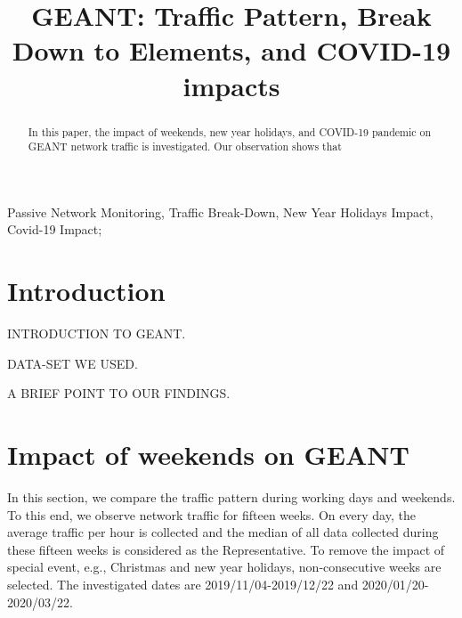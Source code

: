 \documentclass[10pt, journal, letterpaper]{IEEEtran}
\begin{document}
\title{GEANT: Traffic Pattern, Break Down to Elements, and COVID-19 impacts}
\author{}
\maketitle	
\begin{abstract}
In this paper, the impact of weekends, new year holidays, and COVID-19 pandemic on GEANT network traffic is investigated. Our observation shows that 
\end{abstract}	
\begin{IEEEkeywords} 
    Passive Network Monitoring, Traffic Break-Down, New Year Holidays Impact, Covid-19 Impact;
\end{IEEEkeywords}

\section{Introduction}
INTRODUCTION TO GEANT.

DATA-SET WE USED.

A BRIEF POINT TO OUR FINDINGS.

\section{Impact of weekends on GEANT}
In this section, we compare the traffic pattern during working days and weekends. To this end, we observe network traffic for fifteen weeks. On every day, the average traffic per hour is collected and the median of all data collected during these fifteen weeks is considered as the Representative. To remove the impact of special event, e.g., Christmas and new year holidays, non-consecutive weeks are selected. The investigated dates are 2019/11/04-2019/12/22 and 2020/01/20-2020/03/22.
\end{document}
